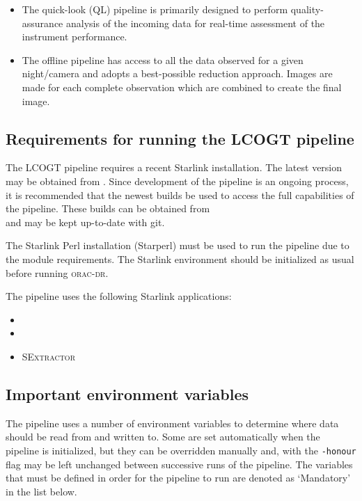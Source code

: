 \documentclass[twoside,11pt,nolof]{starlink}
\providecommand{\CCDPACK}{\xref{\textsc{{Ccdpack}}}{sun139}{}}
\providecommand{\FIGARO}{\xref{\textsc{{Figaro}}}{sun86}{}}
\providecommand{\KAPPA}{\xref{\textsc{{Kappa}}}{sun95}{}}
\providecommand{\SEx}{\textsc{SExtractor}}
\providecommand{\oracdr}{\textsc{orac-dr}}
\begin{document}
\begin{itemize}
\item The quick-look (QL) pipeline is primarily designed to perform
  quality-assurance analysis of the incoming data for real-time
  assessment of the instrument performance. 

\item The offline pipeline has access to all the data observed for a
  given night/camera and adopts a best-possible reduction approach. Images
  are made for each complete observation which are combined to create
  the final image.
\end{itemize}

\subsection{Requirements for running the LCOGT pipeline}

The LCOGT pipeline requires a recent Starlink installation. The
latest version may be obtained from
. Since
development of the pipeline is an ongoing process, it is recommended
that the newest builds be used to access the full capabilities of the
pipeline. These builds can be obtained from\\
and may be kept up-to-date with git.

The Starlink Perl installation (Starperl) must be used to run the
pipeline due to the module requirements. The Starlink environment should be
initialized as usual before running \oracdr.

The pipeline uses the following Starlink applications:
\begin{itemize}
\item \KAPPA
\item \CCDPACK
\item \SEx
\end{itemize}

\subsection{Important environment variables\label{sec:envvars}}

The pipeline uses a number of environment variables to determine where
data should be read from and written to. Some are set automatically
when the pipeline is initialized, but they can be overridden manually
and, with the \verb+-honour+ flag may be left unchanged between
successive runs of the pipeline. The variables that must be defined in
order for the pipeline to run are denoted as `Mandatory' in the list
below.
\end{document}
